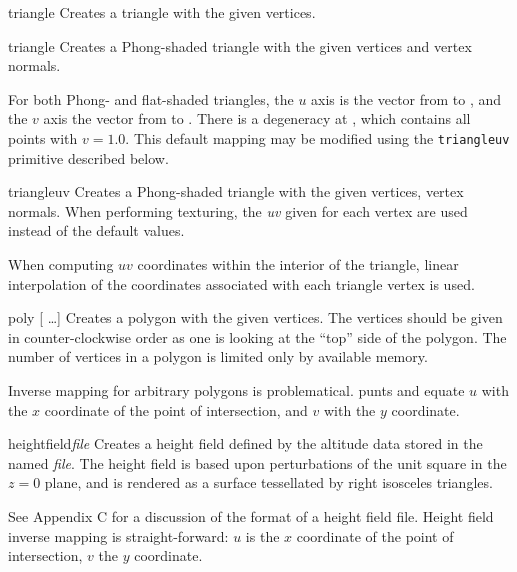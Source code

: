 \begin{defprim}{triangle}{  }
	Creates a triangle with the given vertices.
\end{defprim}

\begin{defprim}{triangle}{   
	 }
	Creates a Phong-shaded triangle with the given vertices and
	vertex normals.
\end{defprim}
For both Phong- and flat-shaded triangles, the $u$ axis is the
vector from  to , and the $v$ axis the vector
from  to .  There is a degeneracy at
, which contains all points with $v = 1.0$.  This default
mapping may be modified using the {\tt triangleuv} primitive described
below.

\begin{defprim}{triangleuv}{  
    
    }
	Creates a Phong-shaded triangle with the given vertices,
	vertex normals.  When performing texturing, the
	{\em uv} given for each vertex are used instead of the
	default values.
\end{defprim}
When computing $uv$ coordinates within the interior of the
triangle, linear interpolation of the coordinates associated with
each triangle vertex is used.

\begin{defprim}{poly}{   [ \ldots ]}
	Creates a polygon with the given vertices. The vertices
	should be given in counter-clockwise order as one is
	looking at the ``top'' side of the polygon.  The number of
	vertices in a polygon is limited only by available memory.
\end{defprim}
Inverse mapping for arbitrary polygons is problematical.
\Rayshade
punts and equate $u$ with the $x$ coordinate of the point of intersection,
and $v$ with the $y$ coordinate.

\begin{defprim}{heightfield}{{\em file}}
	Creates a height field defined by the altitude data stored
	in the named {\em file}.  The height field is based upon
	perturbations of the unit square in the $z=0$ plane, and is
	rendered as a surface tessellated by right isosceles triangles.
\end{defprim}
See Appendix C for a discussion of the format of a height field file.
Height field inverse mapping is straight-forward:  $u$ is the
$x$ coordinate of the point of intersection, $v$ the $y$ coordinate.

